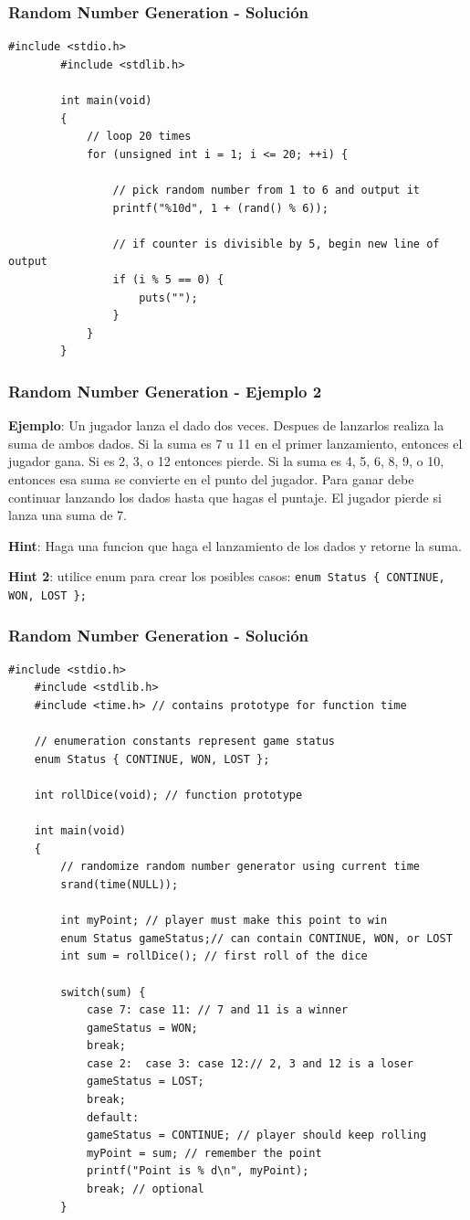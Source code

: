 \documentclass[10.5pt,scale=1.0,t,aspectratio=169,hyperref={pdfpagelabels=false}]{beamer}
\begin{document}
\begin{frame}[fragile]
	\frametitle{Random Number Generation - Solución}
	\begin{lstlisting}[style=CStyle]
		#include <stdio.h>
		#include <stdlib.h>
		
		int main(void)
		{
			// loop 20 times
			for (unsigned int i = 1; i <= 20; ++i) {
				
				// pick random number from 1 to 6 and output it
				printf("%10d", 1 + (rand() % 6));
				
				// if counter is divisible by 5, begin new line of output
				if (i % 5 == 0) {
					puts("");
				}
			}
		}
	\end{lstlisting}
\end{frame}
\begin{frame}
	\frametitle{Random Number Generation - Ejemplo 2}
	\textbf{Ejemplo}: Un jugador lanza el dado dos veces. Despues de lanzarlos realiza la suma de ambos dados. Si la suma es 7 u 11 en el primer lanzamiento, entonces el jugador gana. Si es 2, 3, o 12 entonces pierde. Si la suma es 4, 5, 6, 8, 9, o 10, entonces esa suma se convierte en el punto del jugador. Para ganar debe continuar lanzando los dados hasta que hagas el puntaje. El jugador pierde si lanza una suma de 7.
	
	\textbf{Hint}: Haga una funcion que haga el lanzamiento de los dados y retorne la suma. 
	
	\textbf{Hint 2}: utilice enum para crear los posibles casos: \texttt{enum Status \{ CONTINUE, WON, LOST \};}
\end{frame}
\begin{frame}[fragile]
	\frametitle{Random Number Generation - Solución}
	\begin{lstlisting}[style=CStyle]
	#include <stdio.h>
	#include <stdlib.h>
	#include <time.h> // contains prototype for function time
	
	// enumeration constants represent game status
	enum Status { CONTINUE, WON, LOST };
	
	int rollDice(void); // function prototype
	
	int main(void)
	{
		// randomize random number generator using current time
		srand(time(NULL));
		
		int myPoint; // player must make this point to win
		enum Status gameStatus;// can contain CONTINUE, WON, or LOST
		int sum = rollDice(); // first roll of the dice
		
		switch(sum) {
			case 7: case 11: // 7 and 11 is a winner
			gameStatus = WON;
			break;
			case 2:  case 3: case 12:// 2, 3 and 12 is a loser
			gameStatus = LOST;
			break;
			default:
			gameStatus = CONTINUE; // player should keep rolling
			myPoint = sum; // remember the point
			printf("Point is % d\n", myPoint);
			break; // optional
		}
	\end{lstlisting}
\end{frame}
\end{document}
